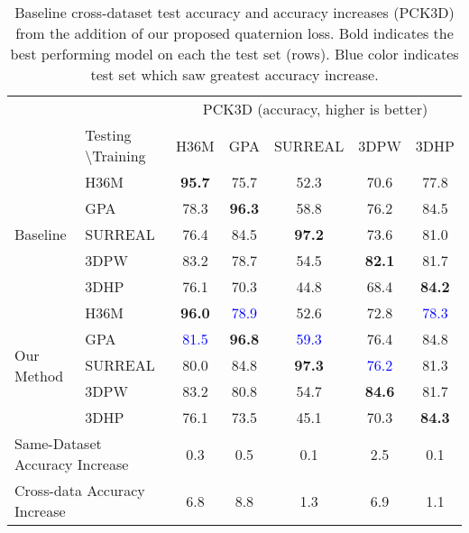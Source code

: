 \documentclass[runningheads]{llncs}
\begin{document}
\begin{table}[t]
\begin{center}
{\scriptsize
\begin{tabular}{@{}ll c c c c c@{}}
\toprule
 & &\multicolumn{5}{c}{PCK3D (accuracy, higher is better)} \\
 & Testing \textbackslash Training & H36M & GPA & SURREAL & 3DPW & 3DHP  \\
\hline
\multirow{5}{*}{Baseline} & H36M & \textbf{95.7} & 75.7 & 52.3  & 70.6  & 77.8\\
&GPA & 78.3 & \textbf{96.3} & 58.8 & 76.2  & 84.5 \\
&SURREAL &  76.4 & 84.5 & \textbf{97.2}  & 73.6  & 81.0  \\
&3DPW & 83.2 & 78.7 & 54.5  & \textbf{82.1} & 81.7 \\
&3DHP & 76.1 & 70.3 &  44.8 & 68.4 &  \textbf{84.2} \\
\hline
\multirow{5}{*}{Our Method} & H36M & \textbf{96.0} & \textcolor{blue}{78.9} & 52.6 & 72.8 & \textcolor{blue}{78.3}  \\
& GPA & \textcolor{blue}{81.5} & \textbf{96.8} & \textcolor{blue}{59.3} & 76.4 & 84.8  \\
& SURREAL & 80.0 & 84.8 & \textbf{97.3} & \textcolor{blue}{76.2} & 81.3 \\
& 3DPW & 83.2 & 80.8 & 54.7 & \textbf{84.6} & 81.7  \\
& 3DHP & 76.1 & 73.5 & 45.1 & 70.3 & \textbf{84.3} \\
\hline
\multicolumn{2}{l}{Same-Dataset Accuracy Increase } & 0.3  & 0.5  & 0.1  & 2.5  & 0.1  \\
\multicolumn{2}{l}{Cross-data Accuracy Increase } & 6.8  & 8.8 & 1.3  & 6.9  & 1.1 \\

\bottomrule
\end{tabular}
}

\end{center}
\caption{Baseline cross-dataset test accuracy and accuracy increases  (PCK3D) from the addition
of our proposed quaternion loss. Bold indicates the best performing model on 
each the test set (rows). Blue color indicates test set which saw greatest accuracy 
increase.}
\label{table:pck3d}
\vspace{-0.15in}
\end{table}
\end{document}
